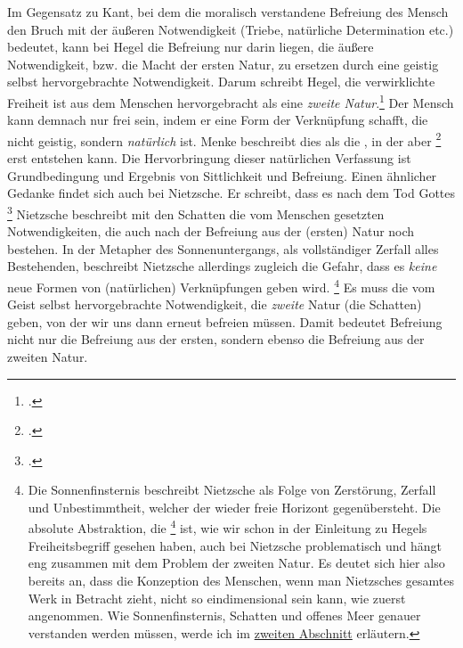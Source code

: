 \documentclass[12pt, a4paper, openany]{report}
\begin{document}
Im Gegensatz zu Kant, bei dem die moralisch verstandene Befreiung des Mensch den Bruch mit der äußeren Notwendigkeit (Triebe, natürliche Determination etc.) bedeutet, kann bei Hegel die Befreiung nur darin liegen, die äußere Notwendigkeit, bzw. die Macht der ersten Natur, zu ersetzen durch eine geistig selbst hervorgebrachte Notwendigkeit.
Darum schreibt Hegel, die verwirklichte Freiheit ist aus dem Menschen hervorgebracht als eine \emph{zweite Natur}.\footcite[Vlg.][§ 4, S. 34.]{hegel_grundlinien_2017}
Der Mensch kann demnach nur frei sein, indem er eine Form der Verknüpfung schafft, die nicht geistig, sondern \emph{natürlich} ist. 
Menke beschreibt dies als die , in der aber \footcite[][40. Hervorhebung von mir]{menke_autonomie_2018} erst entstehen kann.
Die Hervorbringung dieser natürlichen Verfassung ist Grundbedingung und Ergebnis von Sittlichkeit und Befreiung.
Einen ähnlicher Gedanke findet sich auch bei Nietzsche. 
Er schreibt, dass es nach dem Tod Gottes \footcite[][467]{nietzsche_morgenrote_1999}
Nietzsche beschreibt mit den Schatten die vom Menschen gesetzten Notwendigkeiten, die auch nach der Befreiung aus der (ersten) Natur noch bestehen. 
In der Metapher des Sonnenuntergangs, als vollständiger Zerfall alles Bestehenden, beschreibt Nietzsche allerdings zugleich die Gefahr, dass es \emph{keine} neue Formen von (natürlichen) Verknüpfungen geben wird.%
\footnote{
    Die Sonnenfinsternis beschreibt Nietzsche als Folge von Zerstörung, Zerfall und Unbestimmtheit, welcher der wieder freie Horizont gegenübersteht. 
    Die absolute Abstraktion, die \footcite[][§ 5 A, S. 39.]{hegel_grundlinien_2017} ist, wie wir schon in der Einleitung zu Hegels Freiheitsbegriff gesehen haben, auch bei Nietzsche problematisch und hängt eng zusammen mit dem Problem der zweiten Natur.
    Es deutet sich hier also bereits an, dass die Konzeption des  Menschen, wenn man Nietzsches gesamtes Werk in Betracht zieht, nicht so eindimensional sein kann, wie zuerst angenommen.
    Wie Sonnenfinsternis, Schatten und offenes Meer genauer verstanden werden müssen, werde ich im \hyperref[abschnitt_2]{zweiten Abschnitt} erläutern.
}
Es muss die vom Geist selbst hervorgebrachte Notwendigkeit, die \emph{zweite} Natur (die Schatten) geben, von der wir uns dann erneut befreien müssen.
Damit bedeutet Befreiung nicht nur die Befreiung aus der ersten, sondern ebenso die Befreiung aus der zweiten Natur. 
\end{document}
